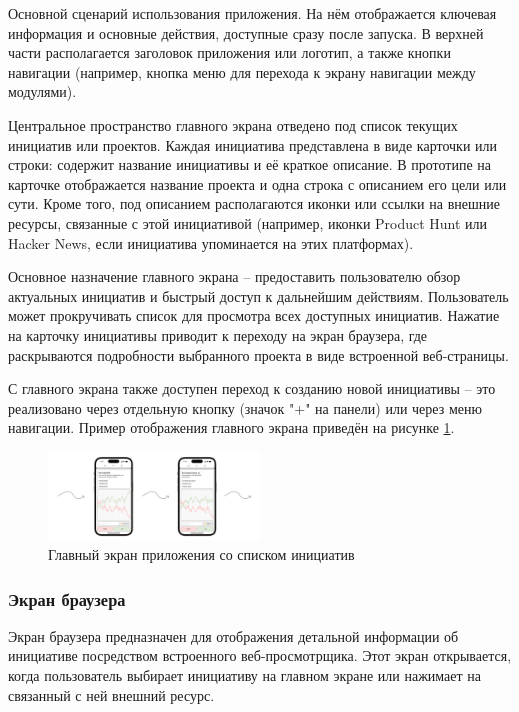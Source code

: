 \documentclass[
    candidate, %
    subf, %
    dotsinheaders=false,
]{disser}
\begin{document}
Основной сценарий использования приложения. На нём отображается ключевая информация и основные действия, доступные сразу после запуска. В верхней части располагается заголовок приложения или логотип, а также кнопки навигации (например, кнопка меню для перехода к экрану навигации между модулями).

Центральное пространство главного экрана отведено под список текущих инициатив или проектов. Каждая инициатива представлена в виде карточки или строки: содержит название инициативы и её краткое описание. В прототипе на карточке отображается название проекта и одна строка с описанием его цели или сути. Кроме того, под описанием располагаются иконки или ссылки на внешние ресурсы, связанные с этой инициативой (например, иконки Product Hunt или Hacker News, если инициатива упоминается на этих платформах).

Основное назначение главного экрана – предоставить пользователю обзор актуальных инициатив и быстрый доступ к дальнейшим действиям. Пользователь может прокручивать список для просмотра всех доступных инициатив. Нажатие на карточку инициативы приводит к переходу на экран браузера, где раскрываются подробности выбранного проекта в виде встроенной веб-страницы.

С главного экрана также доступен переход к созданию новой инициативы – это реализовано через отдельную кнопку (значок "+" на панели) или через меню навигации. Пример отображения главного экрана приведён на рисунке \ref{fig:app-main-flow}.

\begin{figure}[h]
  \centering
  \includegraphics[width=0.5\textwidth]{./assets/app-main-flow.png}
  \caption{Главный экран приложения со списком инициатив}
  \label{fig:app-main-flow}
\end{figure}

\subsubsection{Экран браузера}

Экран браузера предназначен для отображения детальной информации об инициативе посредством встроенного веб-просмотрщика. Этот экран открывается, когда пользователь выбирает инициативу на главном экране или нажимает на связанный с ней внешний ресурс.
\end{document}
